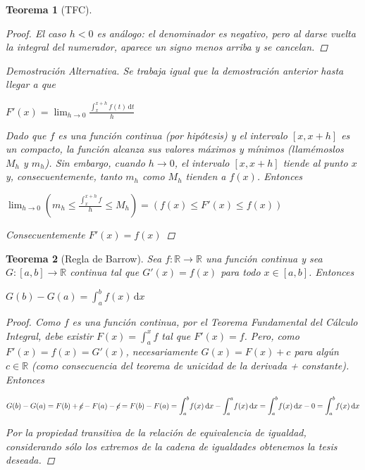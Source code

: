 \documentclass[]{article}
\newtheorem{teo}{Teorema}
\def\R{\mathbb{R}}
\newcommand{\integral}[4]{\int_{#1}^{#2} \! #3 \, \mathrm{d}#4}
\newcommand{\intres}[3]{\int_{#1}^{#2} \! #3}
\begin{document}
\begin{teo}[TFC]
\begin{proof}
		El caso $h<0$ es análogo: el denominador es negativo, pero al darse vuelta la integral del numerador, aparece un signo menos arriba y se cancelan.
	\end{proof}		
	\begin{proof}[Demostración Alternativa]
		Se trabaja igual que la demostración anterior hasta llegar a que
		\begin{center}
			$\displaystyle F'(x) = \lim_{h\to 0}\frac{\integral{x}{x+h}{f(t)}{t}}{h}$
		\end{center}
		
		Dado que $f$ es una función continua (por hipótesis) y el intervalo $[x,x+h]$ es un compacto, la función alcanza sus valores máximos y mínimos (llamémoslos $M_h$ y $m_h$). Sin embargo, cuando $h\to 0$, el intervalo $[x,x+h]$ tiende al punto $x$ y, consecuentemente, tanto $m_h$ como $M_h$ tienden a $f(x)$. Entonces
		\begin{center}
			$\displaystyle \lim_{h\to 0} \left(m_h \leq \frac{\intres{x}{x+h}{f}}{h} \leq M_h\right) = \left(f(x) \leq F'(x) \leq f(x)\right)$
		\end{center}
		Consecuentemente $F'(x) = f(x)$
		\end{proof}
\end{teo}

\begin{teo}[Regla de Barrow]
	Sea $f:\R\to\R$ una función continua y sea $G:[a,b]\to\R$ continua tal que $G'(x) = f(x)$ para todo $x\in[a,b]$. Entonces
	\begin{center}
		$\displaystyle G(b)-G(a) = \integral{a}{b}{f(x)}{x}$
	\end{center}
	\begin{proof}
		Como $f$ es una función continua, por el Teorema Fundamental del Cálculo Integral, debe existir $F(x)=\intres{a}{x}{f}$ tal que $F'(x)=f$. Pero, como $F'(x) = f(x) = G'(x)$, necesariamente $G(x) = F(x)+c$ para algún $c\in\R$ (como consecuencia del teorema de unicidad de la derivada + constante). Entonces
		\begin{center}
			$\displaystyle G(b) - G(a) = F(b) + \cancel{c} - F(a)-\cancel{c} = F(b) - F(a) = \integral{a}{b}{f(x)}{x} - \integral{a}{a}{f(x)}{x} = \integral{a}{b}{f(x)}{x} - 0 = \integral{a}{b}{f(x)}{x}$
		\end{center}
		
		Por la propiedad transitiva de la relación de equivalencia de igualdad, considerando sólo los extremos de la cadena de igualdades obtenemos la tesis deseada.
	\end{proof}
\end{teo}
\end{document}
